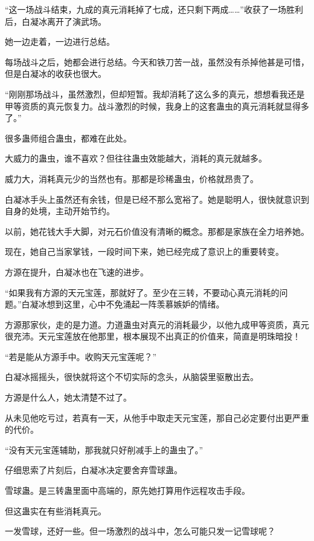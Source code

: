 
\begin{this_body}

“这一场战斗结束，九成的真元消耗掉了七成，还只剩下两成……”收获了一场胜利后，白凝冰离开了演武场。

她一边走着，一边进行总结。

每场战斗之后，她都会进行总结。今天和铁刀苦一战，虽然没有杀掉他甚是可惜，但是白凝冰的收获也很大。

“刚刚那场战斗，虽然激烈，但却短暂。我却消耗了这么多的真元，想想看我还是甲等资质的真元恢复力。战斗激烈的时候，我身上的这套蛊虫的真元消耗就显得多了。”

很多蛊师组合蛊虫，都难在此处。

大威力的蛊虫，谁不喜欢？但往往蛊虫效能越大，消耗的真元就越多。

威力大，消耗真元少的当然也有。那都是珍稀蛊虫，价格就昂贵了。

白凝冰手头上虽然还有余钱，但是已经不那么宽裕了。她是聪明人，很快就意识到自身的处境，主动开始节约。

以前，她花钱大手大脚，对元石价值没有清晰的概念。那都是家族在全力培养她。

现在，她自己当家掌钱，一段时间下来，她已经完成了意识上的重要转变。

方源在提升，白凝冰也在飞速的进步。

“如果我有方源的天元宝莲，那就好了。至少在三转，不要动心真元消耗的问题。”白凝冰想到这里，心中不免涌起一阵羡慕嫉妒的情绪。

方源那家伙，走的是力道。力道蛊虫对真元的消耗最少，以他九成甲等资质，真元很充沛。天元宝莲放在他那里，根本展现不出真正的价值来，简直是明珠暗投！

“若是能从方源手中。收购天元宝莲呢？”

白凝冰摇摇头，很快就将这个不切实际的念头，从脑袋里驱散出去。

方源是什么人，她太清楚不过了。

从未见他吃亏过，若真有一天，从他手中取走天元宝莲，那自己必定要付出更严重的代价。

“没有天元宝莲辅助，那我就只好削减手上的蛊虫了。”

仔细思索了片刻后，白凝冰决定要舍弃雪球蛊。

雪球蛊。是三转蛊里面中高端的，原先她打算用作远程攻击手段。

但这蛊实在有些消耗真元。

一发雪球，还好一些。但一场激烈的战斗中，怎么可能只发一记雪球呢？


\end{this_body}
